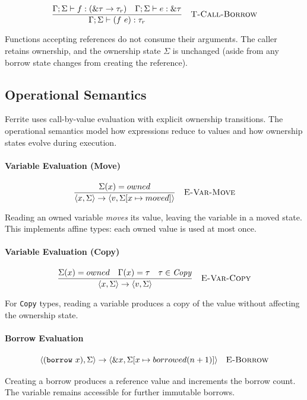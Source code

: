 \documentclass[11pt,a4paper,twoside]{book}
\begin{document}
\[
\frac{
  \Gamma ; \Sigma \vdash f : (\&\tau \rightarrow \tau_r) \quad
  \Gamma ; \Sigma \vdash e : \&\tau
}{
  \Gamma ; \Sigma \vdash (f\ e) : \tau_r
}
\quad \textsc{T-Call-Borrow}
\]

Functions accepting references do not consume their arguments. The caller retains
ownership, and the ownership state $\Sigma$ is unchanged (aside from any borrow
state changes from creating the reference).


\subsection{Operational Semantics}

Ferrite uses call-by-value evaluation with explicit ownership transitions. The
operational semantics model how expressions reduce to values and how ownership
states evolve during execution.

\paragraph{Variable Evaluation (Move)}

\[
\frac{
  \Sigma(x) = owned
}{
  \langle x, \Sigma \rangle \rightarrow \langle v, \Sigma[x \mapsto moved] \rangle
}
\quad \textsc{E-Var-Move}
\]

Reading an owned variable \emph{moves} its value, leaving the variable in a moved
state. This implements affine types: each owned value is used at most once.

\paragraph{Variable Evaluation (Copy)}

\[
\frac{
  \Sigma(x) = owned \quad \Gamma(x) = \tau \quad \tau \in \mathit{Copy}
}{
  \langle x, \Sigma \rangle \rightarrow \langle v, \Sigma \rangle
}
\quad \textsc{E-Var-Copy}
\]

For \texttt{Copy} types, reading a variable produces a copy of the value without
affecting the ownership state.

\paragraph{Borrow Evaluation}

\[
\langle (\mathtt{borrow}\ x), \Sigma \rangle
\rightarrow
\langle \&x, \Sigma[x \mapsto borrowed(n+1)] \rangle
\quad \textsc{E-Borrow}
\]

Creating a borrow produces a reference value and increments the borrow count.
The variable remains accessible for further immutable borrows.
\end{document}
